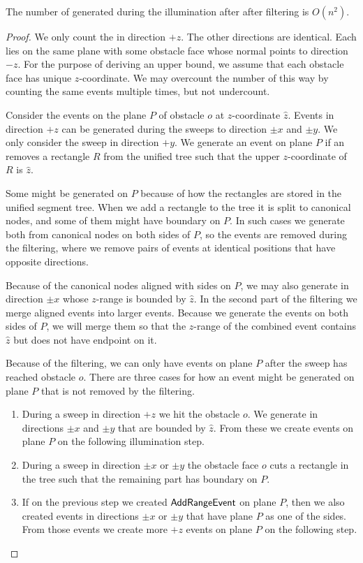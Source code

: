 \documentclass[english,gradu]{tktltiki2018}
\begin{document}
\begin{lem}\label{lem:adde3}The number of \addEs generated during the illumination after after filtering is $O(n^2)$.\end{lem}
\begin{proof}
We only count the \addEs in direction $+z$.
The other directions are identical.
Each \addE lies on the same plane with some obstacle face whose normal points to direction $-z$.
For the purpose of deriving an upper bound, we assume that each obstacle face has unique $z$-coordinate.
We may overcount the number of \addEs this way by counting the same events multiple times, but not undercount.

Consider the events on the plane $P$ of obstacle $o$ at $z$-coordinate $\hat{z}$.
Events in direction $+z$ can be generated during the sweeps to direction $\pm x$ and $\pm y$.
We only consider the sweep in direction $+y$.
We generate an event on plane $P$ if an \obsE removes a rectangle $R$ from the unified tree such that the upper $z$-coordinate of $R$ is $\hat{z}$.

Some \addEs might be generated on $P$ because of how the rectangles are stored in the unified segment tree.
When we add a rectangle to the tree it is split to canonical nodes, and some of them might have boundary on $P$.
In such cases we generate \addEs both from canonical nodes on both sides of $P$, so the events are removed during the filtering, where we remove pairs of events at identical positions that have opposite directions.

Because of the canonical nodes aligned with sides on $P$, we may also generate \addEs in direction $\pm x$ whose $z$-range is bounded by $\hat{z}$.
In the second part of the filtering we merge aligned events into larger events.
Because we generate the events on both sides of $P$, we will merge them so that the $z$-range of the combined event contains $\hat{z}$ but does not have endpoint on it.

Because of the filtering, we can only have events on plane $P$ after the sweep has reached obstacle $o$.
There are three cases for how an event might be generated on plane $P$ that is not removed by the filtering.
\begin{enumerate}
\item During a sweep in direction $+z$ we hit the obstacle $o$.
	We generate \addEs in directions $\pm x$ and $\pm y$ that are bounded by $\hat{z}$.
	From these \addEs we create events on plane $P$ on the following illumination step.
\item During a sweep in direction $\pm x$ or $\pm y$ the obstacle face $o$ cuts a rectangle in the tree such that the remaining part has boundary on $P$.
\item If on the previous step we created $\mathsf{AddRangeEvent}$ on plane $P$, then we also created events in directions $\pm x$ or $\pm y$ that have plane $P$ as one of the sides.
	From those events we create more $+z$ events on plane $P$ on the following step.
\end{enumerate}


\end{proof}
\end{document}

